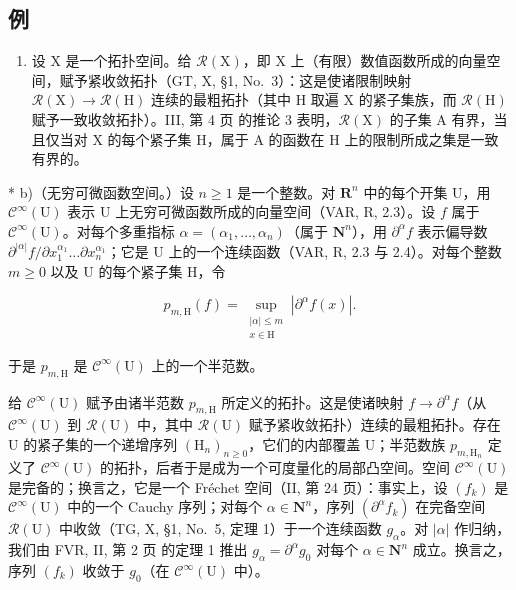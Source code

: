 \subsection{例}

\begin{enumerate}
\def\labelenumi{\alph{enumi})}
\tightlist
\item
  设 X 是一个拓扑空间。给 \(\mathcal{R}(\mathrm{X})\)，即 X 上（有限）数值函数所成的向量空间，赋予紧收敛拓扑（GT, X, §1, No.~3）：这是使诸限制映射 \(\mathcal{R}(\mathrm{X}) \to \mathcal{R}(\mathrm{H})\) 连续的最粗拓扑（其中 H 取遍 X 的紧子集族，而 \(\mathcal{R}(\mathrm{H})\) 赋予一致收敛拓扑）。III, 第 4 页 的推论 3 表明，\(\mathcal{R}(\mathrm{X})\) 的子集 A 有界，当且仅当对 X 的每个紧子集 H，属于 A 的函数在 H 上的限制所成之集是一致有界的。
\end{enumerate}

* b)（无穷可微函数空间。）设 \(n \geqslant 1\) 是一个整数。对 \(\mathbf{R}^n\) 中的每个开集 U，用 \(\mathcal{C}^\infty(\mathrm{U})\) 表示 U 上无穷可微函数所成的向量空间（VAR, R, 2.3）。设 \(f\) 属于 \(\mathcal{C}^\infty(\mathrm{U})\)。对每个多重指标 \(\alpha = (\alpha_1, \dots, \alpha_n)\)（属于 \(\mathbf{N}^n\)），用 \(\partial^\alpha f\) 表示偏导数 \(\partial^{|\alpha|} f / \partial x_1^{\alpha_1} \dots \partial x_n^{\alpha_1}\)；它是 U 上的一个连续函数（VAR, R, 2.3 与 2.4）。对每个整数 \(m \geqslant 0\) 以及 U 的每个紧子集 H，令

\[
p_{m,\mathrm{H}}(f) = \sup_{\substack{|\alpha |\leqslant m\\ x\in \mathrm{H}}}\left|\partial^{\alpha}f(x)\right|.\tag{1}
\]

于是 \(p_{m,\mathrm{H}}\) 是 \(\mathcal{C}^{\infty}(\mathrm{U})\) 上的一个半范数。

给 \(\mathcal{C}^{\infty}(\mathrm{U})\) 赋予由诸半范数 \(p_{m,\mathrm{H}}\) 所定义的拓扑。这是使诸映射 \(f\to \partial^{\alpha}f\)（从 \(\mathcal{C}^{\infty}(\mathrm{U})\) 到 \(\mathcal{R}(\mathrm{U})\) 中，其中 \(\mathcal{R}(\mathrm{U})\) 赋予紧收敛拓扑）连续的最粗拓扑。存在 U 的紧子集的一个递增序列 \((\mathrm{H}_n)_{n\geqslant 0}\)，它们的内部覆盖 U；半范数族 \(p_{m,\mathrm{H}_n}\) 定义了 \(\mathcal{C}^{\infty}(\mathrm{U})\) 的拓扑，后者于是成为一个可度量化的局部凸空间。空间 \(\mathcal{C}^{\infty}(\mathrm{U})\) 是完备的；换言之，它是一个 Fréchet 空间（II, 第 24 页）：事实上，设 \((f_k)\) 是 \(\mathcal{C}^{\infty}(\mathrm{U})\) 中的一个 Cauchy 序列；对每个 \(\alpha \in \mathbf{N}^n\)，序列 \((\partial^{\alpha}f_k)\) 在完备空间 \(\mathcal{R}(\mathrm{U})\) 中收敛（TG, X, §1, No.~5, 定理 1）于一个连续函数 \(g_{\alpha}\)。对 \(|\alpha|\) 作归纳，我们由 FVR, II, 第 2 页 的定理 1 推出 \(g_{\alpha} = \partial^{\alpha}g_{0}\) 对每个 \(\alpha \in \mathbf{N}^n\) 成立。换言之，序列 \((f_k)\) 收敛于 \(g_0\)（在 \(\mathcal{C}^{\infty}(\mathrm{U})\) 中）。

